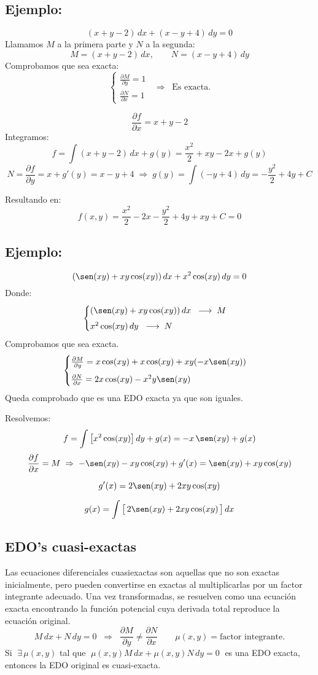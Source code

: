 \documentclass[a4paper,12pt]{article}
\begin{document}
\newpage
\noindent
\subsection*{Ejemplo:}
\vspace{-1.2em}
\[
(x+y-2)\,dx + (x-y+4)\,dy = 0
\]
Llamamos \(M\) a la primera parte y \(N\) a la segunda:
\[
M=(x+y-2)\,dx, \qquad N=(x-y+4)\,dy
\]
Comprobamos que sea exacta:
\[
\begin{cases}
\frac{\partial M}{\partial y}=1 \\[6pt]
\frac{\partial N}{\partial x}=1
\end{cases}
\;\;\Rightarrow\;\; \text{Es exacta.}
\]

\[
\frac{\partial f}{\partial x}=x+y-2
\]
Integramos:
\[
f=\int (x+y-2)\,dx + g(y)
= \frac{x^{2}}{2}+xy-2x+g(y)
\]
\[
N=\frac{\partial f}{\partial y}=x+g'(y)=x-y+4
\;\Rightarrow\;
g(y)=\int(-y+4)\,dy=-\frac{y^{2}}{2}+4y+C
\]

\medskip
\noindent
Resultando en:
\[
f(x,y)=\frac{x^{2}}{2}-2x-\frac{y^{2}}{2}+4y+xy+C=0
\]

\subsection*{Ejemplo:}
\vspace{-1.5em}
\[
(\sen(xy)+xy\cos(xy))\,dx+x^{2}\cos(xy)\,dy=0
\]
Donde:
\[
\begin{cases}
(\sen(xy)+xy\cos(xy))\,dx \;\;\longrightarrow\; M\\[4pt]
x^{2}\cos(xy)\,dy \;\;\longrightarrow\; N
\end{cases}
\]
Comprobamos que sea exacta.
\[
\begin{cases}
\frac{\partial M}{\partial y}
= x\cos(xy) + x\cos(xy) + xy(-x\sen(xy)) \\[6pt]
\frac{\partial N}{\partial x}
= 2x\cos(xy) - x^{2}y\sen(xy)
\end{cases}
\]
Queda comprobado que es una EDO exacta ya que son iguales.

\newpage
\noindent
Resolvemos:
\[
f=\int \big[x^{2}\cos(xy)\big]\,dy + g(x) = -x\,\sen(xy) + g(x)
\]
\[
\frac{\partial f}{\partial x}=M
\;\Rightarrow\;
-\sen(xy)-xy\cos(xy)+g'(x) = \sen(xy)+xy\cos(xy)
\]

\[
g'(x)=2\sen(xy)+2xy\cos(xy)
\]

\[
g(x)=\int \big[\,2\sen(xy)+2xy\cos(xy)\,\big]\,dx
\]
\subsection{EDO's cuasi-exactas}
\noindent
Las ecuaciones diferenciales cuasiexactas son aquellas que no son exactas inicialmente, 
pero pueden convertirse en exactas al multiplicarlas por un factor integrante adecuado. 
Una vez transformadas, se resuelven como una ecuación exacta encontrando la función 
potencial cuya derivada total reproduce la ecuación original.
\[
M\,dx + N\,dy = 0 \;\;\Rightarrow\;\; \frac{\partial M}{\partial y} \neq \frac{\partial N}{\partial x}
\qquad
\mu(x,y)=\text{factor integrante.}
\]
Si $\;\exists\,\mu(x,y)$ tal que $\;\mu(x,y)M\,dx+\mu(x,y)N\,dy=0\;$ es una EDO exacta, entonces la EDO original es cuasi-exacta.
\end{document}
